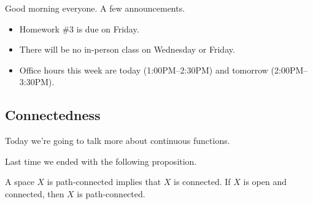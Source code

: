 
Good morning everyone. A few announcements.
\begin{itemize}
	\item Homework \#3 is due on Friday.
	\item There will be no in-person class on Wednesday or Friday.
	\item Office hours this week are today (1:00PM--2:30PM) and tomorrow (2:00PM--3:30PM).
\end{itemize}

\subsection{Connectedness}
Today we're going to talk more about continuous functions.

Last time we ended with the following proposition.
\begin{proposition}
	A space $X$ is path-connected implies that $X$ is connected. If $X$ is open and connected, then $X$ is path-connected.
\end{proposition}
